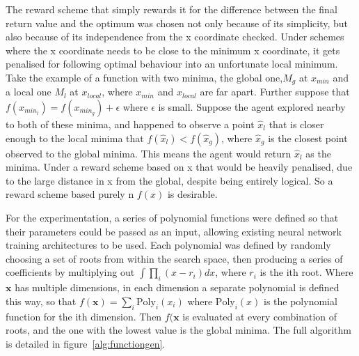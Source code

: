 The reward scheme that simply rewards it for the difference between the final return value and the optimum was chosen not only because of its simplicity, but also because of its independence from the x coordinate checked. Under schemes where the x coordinate needs to be close to the minimum x coordinate, it gets penalised for following optimal behaviour into an unfortunate local minimum. Take the example of a function with two minima, the global one,$M_g$ at $x_{min}$ and a local one $M_l$ at $x_{local}$, where $x_{min}$ and $x_{local}$ are far apart. Further suppose that $f(x_{min_l}) = f(x_{min_g}) + \epsilon$ where $\epsilon$ is small. Suppose the agent explored nearby to both of these minima, and happened to observe a point $\hat x_l$ that is closer  enough to the local minima that $f(\hat x_l) < f(\hat x_g)$, where $\hat x_g$ is the closest point observed to the global minima. This means the agent would return $\hat x_l$ as the minima. Under a reward scheme based on x that would be heavily penalised, due to the large distance in x from the global, despite being entirely logical. So a reward scheme based  purely n $f(x)$ is desirable.

For the experimentation, a series of polynomial functions were defined so that their parameters could be passed as an input, allowing existing neural network training architectures to be used. Each polynomial was defined by randomly choosing a set of roots from within the search space, then producing a series of coefficients by multiplying out
$\int \prod_i (x - r_i) dx$, where $r_i$ is the ith root. Where $\boldsymbol{x}$ has multiple dimensions, in each dimension a separate polynomial is defined this way, so that $f(\boldsymbol{x})  = \sum_i \text{Poly}_i(x_i)$ where $\text{Poly}_i(x)$ is the polynomial function for the ith dimension. Then $f(\boldsymbol{x}$ is evaluated at every combination of roots, and the one with the lowest value is the global minima. The full algorithm is detailed in figure~\ref{alg:functiongen}.

